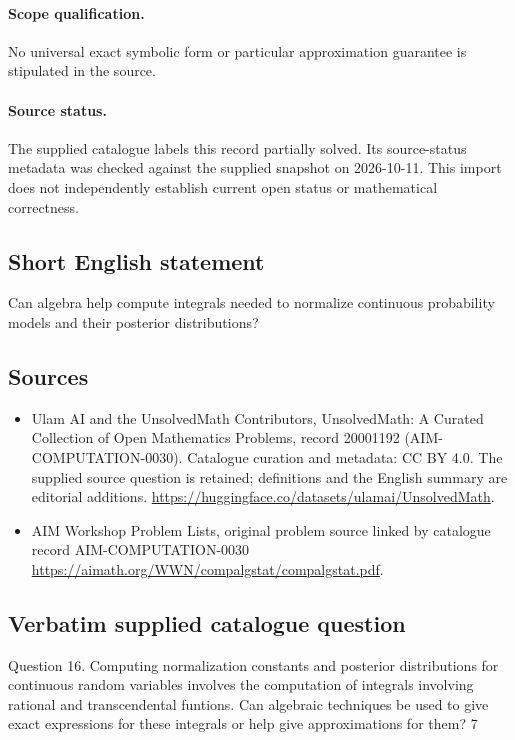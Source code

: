 \documentclass[11pt]{article}
\begin{document}
\paragraph{Scope qualification.}
No universal exact symbolic form or particular approximation guarantee is stipulated in the source.
\paragraph{Source status.}
The supplied catalogue labels this record partially solved. Its source-status metadata was checked against the supplied snapshot on 2026-10-11. This import does not independently establish current open status or mathematical correctness.
\subsection{Short English statement}
Can algebra help compute integrals needed to normalize continuous probability models and their posterior distributions?
\subsection{Sources}
\begin{itemize}
\item[S1] Ulam AI and the UnsolvedMath Contributors, UnsolvedMath: A Curated Collection of Open Mathematics Problems, record 20001192 (AIM-COMPUTATION-0030). Catalogue curation and metadata: CC BY 4.0. The supplied source question is retained; definitions and the English summary are editorial additions.
\url{https://huggingface.co/datasets/ulamai/UnsolvedMath}.
\item[S2] AIM Workshop Problem Lists, original problem source linked by catalogue record AIM-COMPUTATION-0030
\url{https://aimath.org/WWN/compalgstat/compalgstat.pdf}.
\end{itemize}
\subsection{Verbatim supplied catalogue question}
Question 16. Computing normalization constants and posterior distributions for continuous random variables involves the computation of integrals involving rational and transcendental funtions. Can algebraic techniques be used to give exact expressions for these integrals or help give approximations for them? 7
\end{document}
